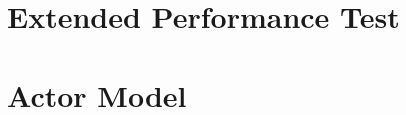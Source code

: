 \makeatletter {}\makeatother
{}
\section{Extended Performance Test}
\label{sec:extended_performance_test}


\section{Actor Model}


\worksheetend
